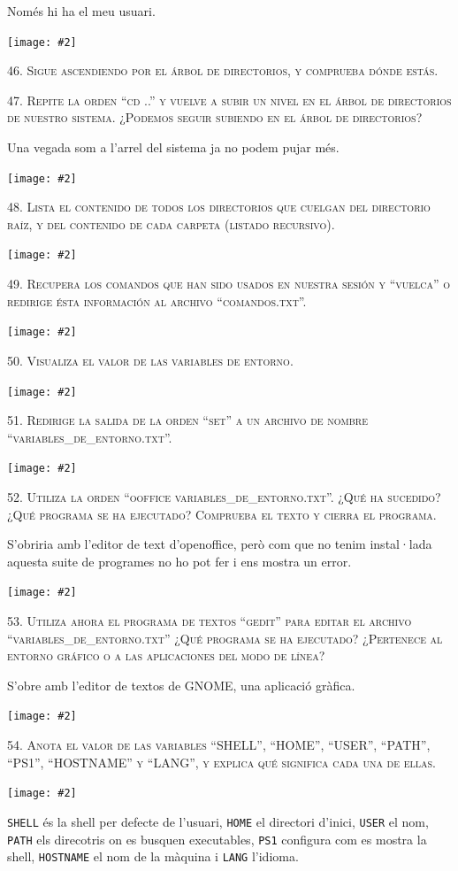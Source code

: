 \documentclass[a4paper,12pt]{article}
\newcommand{\mygraphic}[2][height=0.45\textheight]{\begin{center}
		\centering\texttt{[image: \#2]}\par
\end{center}}
\begin{document}
Només hi ha el meu usuari.
\mygraphic{imatges/45.png}

\newpage
\textsc{46. Sigue ascendiendo por el árbol de directorios, y comprueba dónde estás.}

\textsc{47. Repite la orden “cd ..” y vuelve a subir un nivel en el árbol de directorios de nuestro sistema. ¿Podemos seguir subiendo en el árbol de directorios?}

Una vegada som a l'arrel del sistema ja no podem pujar més.
\mygraphic{imatges/46-47.png}

\newpage
\textsc{48. Lista el contenido de todos los directorios que cuelgan del directorio raíz, y del  contenido de cada carpeta (listado recursivo).}
\mygraphic{imatges/48.png}

\newpage
\textsc{49. Recupera los comandos que han sido usados en nuestra sesión y “vuelca” o redirige ésta información al archivo “comandos.txt”.}
\mygraphic{imatges/49.png}

\newpage
\textsc{50. Visualiza el valor de las variables de entorno.}
\mygraphic{imatges/50.png}

\newpage
\textsc{51. Redirige la salida de la orden “set” a un archivo de nombre “variables\_de\_entorno.txt”.}
\mygraphic{imatges/51.png}

\newpage
\textsc{52. Utiliza la orden “ooffice variables\_de\_entorno.txt”. ¿Qué ha sucedido? ¿Qué programa se ha ejecutado? Comprueba el texto y cierra el programa.}

S'obriria amb l'editor de text d'openoffice, però com que no tenim instal·lada aquesta suite de programes no ho pot fer i ens mostra un error.
\mygraphic{imatges/52.png}

\newpage
\textsc{53. Utiliza ahora el programa de textos “gedit” para editar el archivo “variables\_de\_entorno.txt” ¿Qué programa se ha ejecutado? ¿Pertenece al entorno gráfico o a las aplicaciones del modo de línea? }

S'obre amb l'editor de textos de GNOME, una aplicació gràfica.
\mygraphic{imatges/53.png}

\newpage
\textsc{54. Anota el valor de las variables “SHELL”, “HOME”, “USER”, “PATH”, “PS1”, “HOSTNAME” y “LANG”, y explica qué significa cada una de ellas.}
\mygraphic{imatges/54.png}
\texttt{SHELL} és la shell per defecte de l'usuari, \texttt{HOME} el directori d'inici, \texttt{USER} el nom, \texttt{PATH} els direcotris on es busquen executables, \texttt{PS1} configura com es mostra la shell, \texttt{HOSTNAME} el nom de la màquina i \texttt{LANG} l'idioma.
\end{document}
